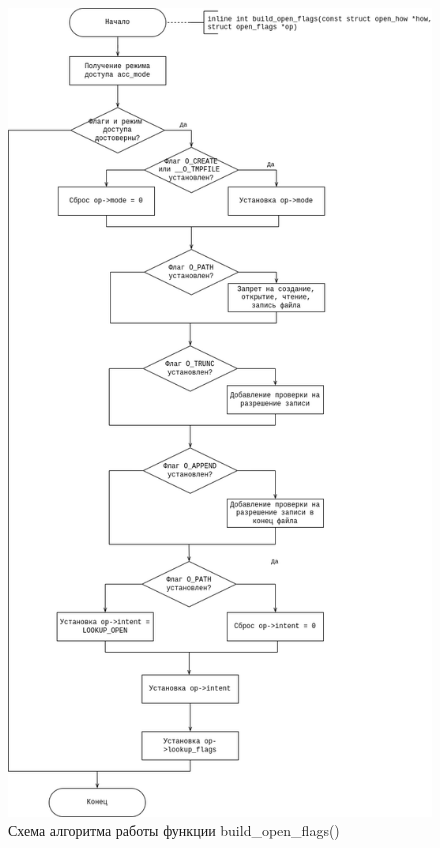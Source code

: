 \begin{figure}[H]
	\centering
	\includegraphics[scale=0.5]{assets/flowchart-build_.drawio.png}
	\caption{Схема алгоритма работы функции build\_open\_flags()}
\end{figure}

